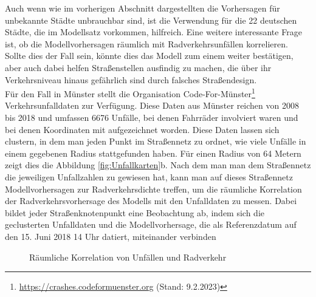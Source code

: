 \documentclass[a4paper,12pt]{thesis}
\begin{document}
Auch wenn wie im vorherigen Abschnitt dargestellten die Vorhersagen für unbekannte Städte unbrauchbar sind, ist die Verwendung für die 22 deutschen Städte, die im Modellsatz vorkommen, hilfreich. Eine weitere interessante Frage ist, ob die Modellvorhersagen räumlich mit Radverkehrsunfällen korrelieren. Sollte dies der Fall sein, könnte dies das Modell zum einem weiter bestätigen, aber auch dabei helfen Straßenstellen ausfindig zu machen, die über ihr Verkehrsniveau hinaus gefährlich sind durch falsches Straßendesign.\\
Für den Fall in Münster stellt die Organisation Code-For-Münster\footnote{\url{https://crashes.codeformuenster.org} (Stand: 9.2.2023)} Verkehrsunfalldaten zur Verfügung. Diese Daten aus Münster reichen von 2008 bis 2018 und umfassen 6676 Unfälle, bei denen Fahrräder involviert waren und bei denen Koordinaten mit aufgezeichnet worden. Diese Daten lassen sich clustern, in dem man jeden Punkt im Straßennetz zu ordnet, wie viele Unfälle in einem gegebenen Radius stattgefunden haben. Für einen Radius von 64 Metern zeigt dies die Abbildung \ref{fig:Unfallkarten}b. Nach dem man man dem Straßennetz die jeweiligen Unfallzahlen zu gewiesen hat, kann man auf dieses Straßennetz Modellvorhersagen zur Radverkehrsdichte treffen, um die räumliche Korrelation der Radverkehrsvorhersage des Modells mit den Unfalldaten zu messen. Dabei bildet jeder Straßenknotenpunkt eine Beobachtung ab, indem sich die geclusterten Unfalldaten und die Modellvorhersage, die als Referenzdatum auf den 15. Juni 2018 14 Uhr datiert, miteinander verbinden\\

\begin{figure}%
	\centering
	\qquad
	\caption{Räumliche Korrelation von Unfällen und Radverkehr}%
	\label{fig:UnfallKorrelatoon}%
\end{figure}
\end{document}
